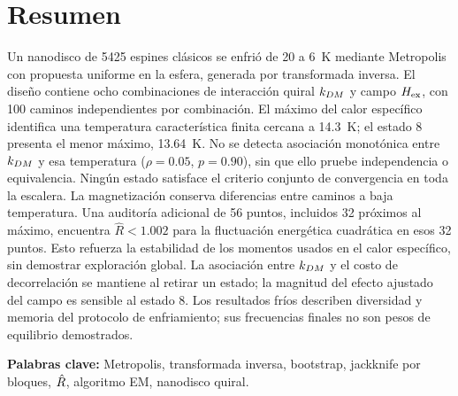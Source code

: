 \section*{Resumen}

Un nanodisco de 5425 espines clásicos se enfrió de 20 a 6~K mediante Metropolis con propuesta uniforme en la esfera, generada por transformada inversa. El diseño contiene ocho combinaciones de interacción quiral $k_{DM}$ y campo $H_{\mathrm{ex}}$, con 100 caminos independientes por combinación. El máximo del calor específico identifica una temperatura característica finita cercana a 14.3~K; el estado 8 presenta el menor máximo, 13.64~K. No se detecta asociación monotónica entre $k_{DM}$ y esa temperatura ($\rho=0.05$, $p=0.90$), sin que ello pruebe independencia o equivalencia. Ningún estado satisface el criterio conjunto de convergencia en toda la escalera. La magnetización conserva diferencias entre caminos a baja temperatura. Una auditoría adicional de 56 puntos, incluidos 32 próximos al máximo, encuentra $\hat R<1.002$ para la fluctuación energética cuadrática en esos 32 puntos. Esto refuerza la estabilidad de los momentos usados en el calor específico, sin demostrar exploración global. La asociación entre $k_{DM}$ y el costo de decorrelación se mantiene al retirar un estado; la magnitud del efecto ajustado del campo es sensible al estado 8. Los resultados fríos describen diversidad y memoria del protocolo de enfriamiento; sus frecuencias finales no son pesos de equilibrio demostrados.

\noindent\textbf{Palabras clave:} Metropolis, transformada inversa, bootstrap, jackknife por bloques, $\hat R$, algoritmo EM, nanodisco quiral.
